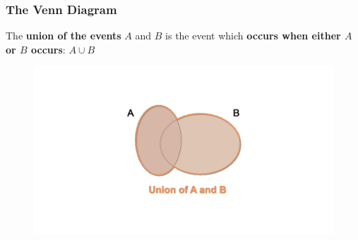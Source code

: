 \documentclass[notes=show]{beamer}\usepackage[]{graphicx}\usepackage[]{color}
\begin{document}
\begin{frame}
\frametitle{The Venn Diagram}

The \textbf{union of the events} $A$ and $B$ is the event which \textbf{occurs when either $A$ or $B$ occurs}: $A \cup B$
\begin{figure}[h!]
\centering
\includegraphics[width=1\textwidth,height=0.7\textheight]{img/charts/charts.005.png}
\end{figure}

\end{frame}
\end{document}
